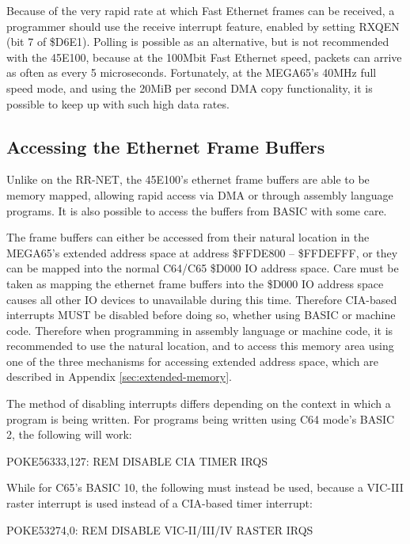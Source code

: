 Because of the very rapid rate at which Fast Ethernet frames can be received, a programmer should use the
receive interrupt feature, enabled by setting RXQEN (bit 7 of \$D6E1).  Polling is possible as an alternative, but
is not recommended with the 45E100, because at the 100Mbit Fast Ethernet speed, packets can arrive
as often as every 5 microseconds.  Fortunately, at the MEGA65's 40MHz full speed mode, and using
the 20MiB per second DMA copy functionality, it is possible to keep up with such high data rates.

\subsection{Accessing the Ethernet Frame Buffers}

Unlike on the RR-NET, the 45E100's ethernet frame buffers are able to be memory mapped, allowing rapid access via DMA
or through assembly language programs.  It is also possible to access the buffers from BASIC with some care.

The frame buffers can either be accessed from their natural location in the MEGA65's extended address space at address
\$FFDE800 -- \$FFDEFFF, or they can be mapped into the normal C64/C65 \$D000 IO address space.  Care must be
taken as mapping the ethernet frame buffers into the \$D000 IO address space causes all other IO devices to unavailable
during this time.  Therefore CIA-based interrupts MUST be disabled before doing so, whether using BASIC or machine code.  Therefore
when programming in assembly language or machine code, it is recommended to use the natural location, and to access this
memory area using one of the three mechanisms for accessing extended address space, which are described in Appendix
\ref{sec:extended-memory}.

The method of
disabling interrupts differs depending on the context in which a program is being written. For programs being written using C64 mode's BASIC 2, the following will work:

\begin{screenoutput}
  POKE56333,127: REM DISABLE CIA TIMER IRQS
\end{screenoutput}

While for C65's BASIC 10, the following must instead be used, because a VIC-III raster interrupt is used instead of a CIA-based timer interrupt:

\begin{screenoutput}
POKE53274,0: REM DISABLE VIC-II/III/IV RASTER IRQS
\end{screenoutput}

